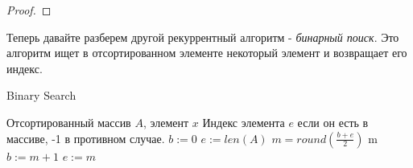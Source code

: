 \documentclass[../main.tex]{subfiles}
\begin{document}
	\begin{proof}
		\begin{comment}
		\begin{center}
			\begin{tikzpicture}
				\begin{scope}[every node/.style={circle,thick,draw}]
					\node[label=\large$ cn^d $] (top) at (10, 10) {};
					
					\node[label=left:\Large $ \frac{cn^d}{b^d}$] (mid-left) at (7, 8) {};
					\node (mid-right) at (13, 8) {};
					
					\node (bot-left) at (5, 6) {};
					\node[label=right:\Large $ \frac{cn^d}{b^{2d}} $] (bot-right) at (9, 6) {};
				\end{scope}
				
				\begin{scope}[>={Stealth[black]}, every edge/.style={draw=black,very thick}]
					\path [->] (top) edge (mid-left);
					\path [->] (top) edge (mid-right);
					
					\path [->] (mid-left) edge (bot-left);
					\path [->] (mid-left) edge (bot-right);
					
					\draw[dashed] (mid-left) -- node[above] {$a$} (mid-right);
					\draw[dashed] (bot-left) -- node[above] {$a$} (bot-right);
				\end{scope}
			\end{tikzpicture}
		\end{center}
		На каждом уровне мы делим задачу на a подзадач, размер каждой отличается от другого уровня в b раз.  
		
		на i уровне, n/b^i -- размер подзадачи
		всего на каждом уровне a^i подзадач.
		на каждом уровне a_i * (n/b^i)^d * c
		отсюда основная теорема.
		\end{comment}
	\end{proof}
	
	
	
	Теперь давайте разберем другой рекуррентный алгоритм - \textit{бинарный поиск}. Это алгоритм ищет в отсортированном элементе некоторый элемент и возвращает его индекс.
		
	\begin{algorithm}[H]
		\caption{Binary Search}
		\begin{algorithmic}[1]
			\Require Отсортированный массив $A$, элемент $x$
			\Ensure Индекс элемента $e$ если он есть в массиве, -1 в противном случае.
				\State $b := 0$
				\State $e := len(A)$
					\State $m = round(\frac{b + e}{2})$
						\State \Return m
						\State $b := m + 1$
					\Else
						\State $e := m$
					\EndIf
				\EndWhile
				\State {}
			\EndFunction
		\end{algorithmic}
	\end{algorithm}
	
\end{document}
